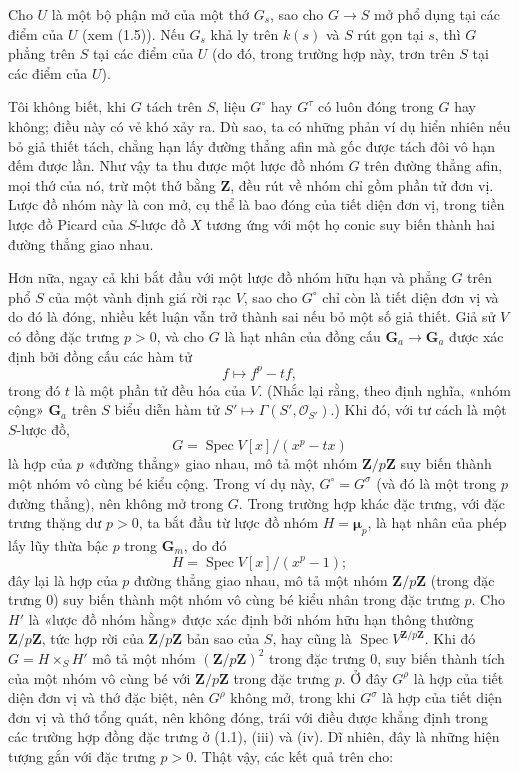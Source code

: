  Cho $U$ là một bộ phận mở của một thớ $G_s$, sao cho
$G\longrightarrow S$ mở phổ dụng tại các điểm của $U$ (xem (1.5)). Nếu $G_s$
khả ly trên $k(s)$ và $S$ rút gọn tại $s$, thì $G$ phẳng trên $S$ tại các điểm
của $U$ (do đó, trong trường hợp này, trơn trên $S$ tại các điểm của $U$).

 Tôi không biết, khi $G$ tách trên $S$, liệu
$G^\circ$ hay $G^\tau$ có luôn đóng trong $G$ hay không; điều này có vẻ khó xảy
ra. Dù sao, ta có những phản ví dụ hiển nhiên nếu bỏ giả thiết tách, chẳng hạn
lấy đường thẳng afin mà gốc được tách đôi vô hạn đếm được lần. Như vậy ta thu
được một lược đồ nhóm $G$ trên đường thẳng afin, mọi thớ của nó, trừ một thớ
bằng $\mathbf Z$, đều rút về nhóm chỉ gồm phần tử đơn vị. Lược đồ nhóm này là
con mở, cụ thể là bao đóng của tiết diện đơn vị, trong tiền lược đồ Picard của
$S$-lược đồ $X$ tương ứng với một họ conic suy biến thành hai đường thẳng giao
nhau.

Hơn nữa, ngay cả khi bắt đầu với một lược đồ nhóm hữu hạn và phẳng $G$ trên
phổ $S$ của một vành định giá rời rạc $V$, sao cho $G^\circ$ chỉ còn là tiết
diện đơn vị và do đó là đóng, nhiều kết luận vẫn trở thành sai nếu bỏ một số
giả thiết. Giả sử $V$ có đồng đặc trưng $p>0$, và cho $G$ là hạt nhân của đồng
cấu
$\mathbf G_a\longrightarrow\mathbf G_a$ được xác định bởi đồng cấu các hàm tử
\[
f\longmapsto f^p-tf,
\]
trong đó $t$ là một phần tử đều hóa của $V$.
(Nhắc lại rằng, theo định nghĩa, «nhóm cộng» $\mathbf G_a$ trên $S$ biểu diễn
hàm tử $S'\longmapsto\Gamma(S',\mathcal O_{S'})$.) Khi đó, với tư cách là một
$S$-lược đồ,
\[
G=\operatorname{Spec}V[x]/(x^p-tx)
\]
là hợp của $p$ «đường thẳng» giao nhau, mô tả một nhóm
$\mathbf Z/p\mathbf Z$ suy biến thành một nhóm vô cùng bé kiểu cộng. Trong ví
dụ này, $G^\circ=G^\sigma$ (và đó là một trong $p$ đường thẳng), nên không mở
trong $G$. Trong trường hợp khác đặc trưng, với đặc trưng thặng dư $p>0$, ta
bắt đầu từ lược đồ nhóm $H=\boldsymbol\mu_p$, là hạt nhân của phép lấy lũy thừa
bậc $p$ trong $\mathbf G_m$, do đó
\[
H=\operatorname{Spec}V[x]/(x^p-1) ;
\]
đây lại là hợp của $p$ đường thẳng giao nhau, mô tả một nhóm
$\mathbf Z/p\mathbf Z$ (trong đặc trưng 0) suy biến thành một nhóm vô cùng bé
kiểu nhân trong đặc trưng $p$. Cho $H'$ là «lược đồ nhóm hằng» được xác định
bởi nhóm hữu hạn thông thường $\mathbf Z/p\mathbf Z$, tức hợp rời của
$\mathbf Z/p\mathbf Z$ bản sao của $S$, hay cũng là
$\operatorname{Spec}V^{\mathbf Z/p\mathbf Z}$. Khi đó $G=H\times_S H'$ mô tả
một nhóm $(\mathbf Z/p\mathbf Z)^2$ trong đặc trưng 0, suy biến thành tích của
một nhóm vô cùng bé với $\mathbf Z/p\mathbf Z$ trong đặc trưng $p$. Ở đây
$G^\rho$ là hợp của tiết diện đơn vị và thớ đặc biệt, nên $G^\rho$ không mở,
trong khi $G^\sigma$ là hợp của tiết diện đơn vị và thớ tổng quát, nên không
đóng, trái với điều được khẳng định trong các trường hợp đồng đặc trưng ở
(1.1), (iii) và (iv). Dĩ nhiên, đây là những hiện tượng gắn với đặc trưng
$p>0$. Thật vậy, các kết quả trên cho:

